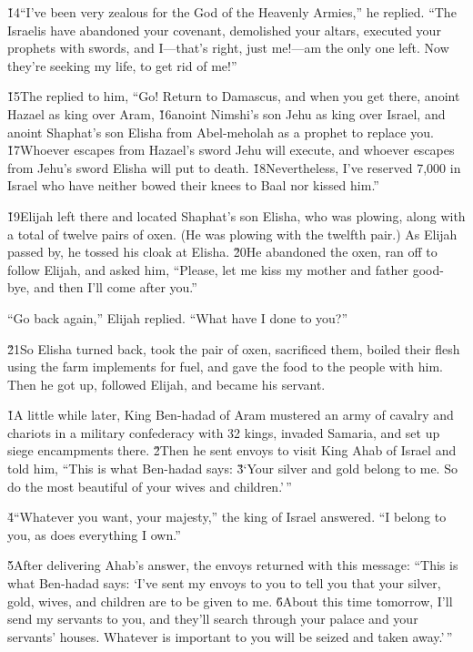 \v{14}``I've been very zealous for the  God of the Heavenly Armies,'' he replied. ``The Israelis have abandoned your covenant, demolished your altars, executed your prophets with swords, and I---that's right, just me!---am the only one left. Now they're seeking my life, to get rid of me!''

\v{15}The  replied to him, ``Go! Return to Damascus, and when you get there, anoint Hazael as king over Aram, \v{16}anoint Nimshi's son Jehu as king over Israel, and anoint Shaphat's son Elisha from Abel-meholah as a prophet to replace you. \v{17}Whoever escapes from Hazael's sword Jehu will execute, and whoever escapes from Jehu's sword Elisha will put to death. \v{18}Nevertheless, I've reserved 7,000 in Israel who have neither bowed their knees to Baal nor kissed him.''

\v{19}Elijah left there and located Shaphat's son Elisha, who was plowing, along with a total of twelve pairs of oxen. (He was plowing with the twelfth pair.) As Elijah passed by, he tossed his cloak at Elisha. \v{20}He abandoned the oxen, ran off to follow Elijah, and asked him, ``Please, let me kiss my mother and father good-bye, and then I'll come after you.''

``Go back again,'' Elijah replied. ``What have I done to you?''

\v{21}So Elisha turned back, took the pair of oxen, sacrificed them, boiled their flesh using the farm implements for fuel, and gave the food to the people with him. Then he got up, followed Elijah, and became his servant.

\v{1}A little while later, King Ben-hadad of Aram mustered an army of cavalry and chariots in a military confederacy with 32 kings, invaded Samaria, and set up siege encampments there. \v{2}Then he sent envoys to visit King Ahab of Israel and told him, ``This is what Ben-hadad says: \v{3}`Your silver and gold belong to me. So do the most beautiful of your wives and children.'\,''

\v{4}``Whatever you want, your majesty,'' the king of Israel answered. ``I belong to you, as does everything I own.''

\v{5}After delivering Ahab's answer, the envoys returned with this message: ``This is what Ben-hadad says: `I've sent my envoys to you to tell you that your silver, gold, wives, and children are to be given to me. \v{6}About this time tomorrow, I'll send my servants to you, and they'll search through your palace and your servants' houses. Whatever is important to you will be seized and taken away.'\,''

